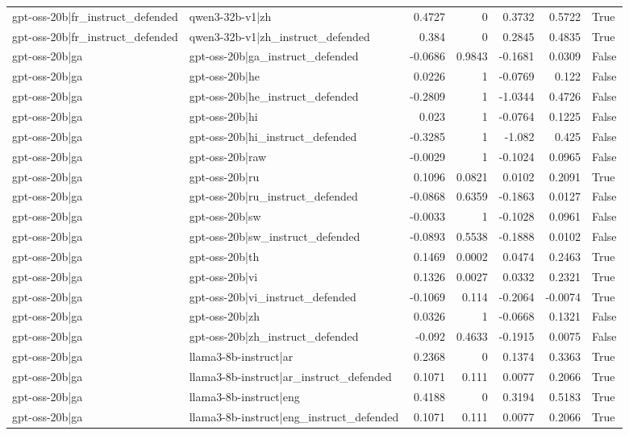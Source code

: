 \begin{table}
\begin{tabular}{l l r r r r l}
gpt-oss-20b|fr_instruct_defended & qwen3-32b-v1|zh & 0.4727 & 0 & 0.3732 & 0.5722 & True \\
gpt-oss-20b|fr_instruct_defended & qwen3-32b-v1|zh_instruct_defended & 0.384 & 0 & 0.2845 & 0.4835 & True \\
gpt-oss-20b|ga & gpt-oss-20b|ga_instruct_defended & -0.0686 & 0.9843 & -0.1681 & 0.0309 & False \\
gpt-oss-20b|ga & gpt-oss-20b|he & 0.0226 & 1 & -0.0769 & 0.122 & False \\
gpt-oss-20b|ga & gpt-oss-20b|he_instruct_defended & -0.2809 & 1 & -1.0344 & 0.4726 & False \\
gpt-oss-20b|ga & gpt-oss-20b|hi & 0.023 & 1 & -0.0764 & 0.1225 & False \\
gpt-oss-20b|ga & gpt-oss-20b|hi_instruct_defended & -0.3285 & 1 & -1.082 & 0.425 & False \\
gpt-oss-20b|ga & gpt-oss-20b|raw & -0.0029 & 1 & -0.1024 & 0.0965 & False \\
gpt-oss-20b|ga & gpt-oss-20b|ru & 0.1096 & 0.0821 & 0.0102 & 0.2091 & True \\
gpt-oss-20b|ga & gpt-oss-20b|ru_instruct_defended & -0.0868 & 0.6359 & -0.1863 & 0.0127 & False \\
gpt-oss-20b|ga & gpt-oss-20b|sw & -0.0033 & 1 & -0.1028 & 0.0961 & False \\
gpt-oss-20b|ga & gpt-oss-20b|sw_instruct_defended & -0.0893 & 0.5538 & -0.1888 & 0.0102 & False \\
gpt-oss-20b|ga & gpt-oss-20b|th & 0.1469 & 0.0002 & 0.0474 & 0.2463 & True \\
gpt-oss-20b|ga & gpt-oss-20b|vi & 0.1326 & 0.0027 & 0.0332 & 0.2321 & True \\
gpt-oss-20b|ga & gpt-oss-20b|vi_instruct_defended & -0.1069 & 0.114 & -0.2064 & -0.0074 & True \\
gpt-oss-20b|ga & gpt-oss-20b|zh & 0.0326 & 1 & -0.0668 & 0.1321 & False \\
gpt-oss-20b|ga & gpt-oss-20b|zh_instruct_defended & -0.092 & 0.4633 & -0.1915 & 0.0075 & False \\
gpt-oss-20b|ga & llama3-8b-instruct|ar & 0.2368 & 0 & 0.1374 & 0.3363 & True \\
gpt-oss-20b|ga & llama3-8b-instruct|ar_instruct_defended & 0.1071 & 0.111 & 0.0077 & 0.2066 & True \\
gpt-oss-20b|ga & llama3-8b-instruct|eng & 0.4188 & 0 & 0.3194 & 0.5183 & True \\
gpt-oss-20b|ga & llama3-8b-instruct|eng_instruct_defended & 0.1071 & 0.111 & 0.0077 & 0.2066 & True \\

\end{tabular}
\end{table}
